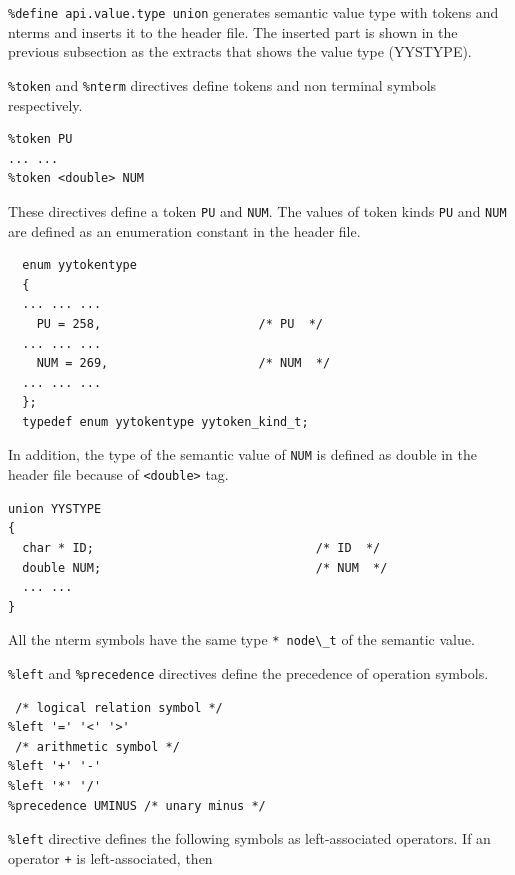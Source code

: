 \passthrough{\lstinline!\%define api.value.type union!} generates
semantic value type with tokens and nterms and inserts it to the header
file. The inserted part is shown in the previous subsection as the
extracts that shows the value type (YYSTYPE).

\passthrough{\lstinline!\%token!} and \passthrough{\lstinline!\%nterm!}
directives define tokens and non terminal symbols respectively.

\begin{lstlisting}
%token PU
... ...
%token <double> NUM
\end{lstlisting}

These directives define a token \passthrough{\lstinline!PU!} and
\passthrough{\lstinline!NUM!}. The values of token kinds
\passthrough{\lstinline!PU!} and \passthrough{\lstinline!NUM!} are
defined as an enumeration constant in the header file.

\begin{lstlisting}
  enum yytokentype
  {
  ... ... ...
    PU = 258,                      /* PU  */
  ... ... ...
    NUM = 269,                     /* NUM  */
  ... ... ...
  };
  typedef enum yytokentype yytoken_kind_t;
\end{lstlisting}

In addition, the type of the semantic value of
\passthrough{\lstinline!NUM!} is defined as double in the header file
because of \passthrough{\lstinline!<double>!} tag.

\begin{lstlisting}
union YYSTYPE
{
  char * ID;                               /* ID  */
  double NUM;                              /* NUM  */
  ... ...
}
\end{lstlisting}

All the nterm symbols have the same type
\passthrough{\lstinline!* node\_t!} of the semantic value.

\passthrough{\lstinline!\%left!} and
\passthrough{\lstinline!\%precedence!} directives define the precedence
of operation symbols.

\begin{lstlisting}
 /* logical relation symbol */
%left '=' '<' '>'
 /* arithmetic symbol */
%left '+' '-'
%left '*' '/'
%precedence UMINUS /* unary minus */
\end{lstlisting}

\passthrough{\lstinline!\%left!} directive defines the following symbols
as left-associated operators. If an operator \passthrough{\lstinline!+!}
is left-associated, then

